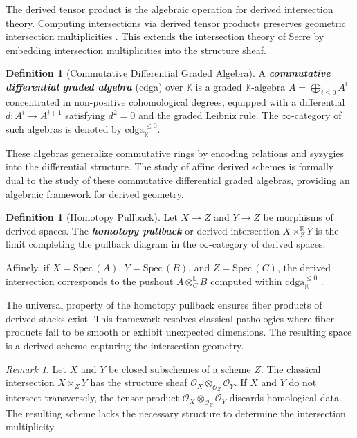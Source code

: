 \documentclass[reqno]{amsart}
\theoremstyle{definition}
\newtheorem{definition}[theorem]{Definition}
\theoremstyle{remark}
\newtheorem{remark}[theorem]{Remark}
\newcommand{\K}{\mathbb{K}}
\newcommand{\Spec}{\mathrm{Spec\,}}
\newcommand{\bfem}[1]{\textbf{\textit{#1}}}
\begin{document}
The derived tensor product is the algebraic
operation for derived intersection theory. Computing intersections
via derived tensor products preserves geometric intersection
multiplicities \cite[Section 1.1]{PTVV}. This
extends the intersection theory of Serre by
embedding intersection multiplicities into the structure sheaf.

\begin{definition}[Commutative Differential Graded Algebra]
  A \bfem{commutative differential graded algebra} (cdga) over $\K$
  is a graded $\K$-algebra $A = \bigoplus_{i \le 0} A^i$ concentrated
  in non-positive cohomological degrees, equipped with a differential
  $d: A^i \to
  A^{i+1}$ satisfying $d^2 = 0$ and the graded Leibniz rule.
  The $\infty$-category of such algebras is denoted by
  $\mathrm{cdga}_\K^{\leq 0}$.
\end{definition}
These algebras generalize commutative rings by
encoding relations and syzygies into the differential
structure. The study of affine derived schemes is formally dual to
the study of these commutative differential graded algebras,
providing an algebraic framework for derived geometry.

\begin{definition}[Homotopy Pullback]
  Let $X \to Z$ and $Y \to Z$ be morphisms of derived spaces. The
  \bfem{homotopy pullback} or derived intersection $X
  \times_Z^{\mathbb{R}} Y$ is the limit completing the
  pullback diagram in the $\infty$-category of derived spaces. 
  
  Affinely, if
  $X = \Spec(A)$, $Y = \Spec(B)$, and $Z = \Spec(C)$, the derived
  intersection corresponds to the pushout $A
  \otimes_C^{\mathbb{L}} B$ computed within
  $\mathrm{cdga}_\K^{\leq 0}$
  \cite[Section 2.2.2]{HAG-II}.
\end{definition}

The universal property of the homotopy pullback ensures fiber
products of derived stacks exist. This framework resolves classical
pathologies where fiber
products fail to be smooth or exhibit unexpected dimensions. The
resulting space is a derived scheme
capturing the intersection geometry.

\begin{remark}
  Let $X$ and $Y$ be closed subschemes of a scheme $Z$. The classical intersection $X \times_Z Y$ has the structure sheaf $\mathcal{O}_X \otimes_{\mathcal{O}_Z} \mathcal{O}_Y$. If $X$ and $Y$ do not intersect transversely, the tensor product $\mathcal{O}_X \otimes_{\mathcal{O}_Z} \mathcal{O}_Y$ discards homological data. The resulting scheme lacks the necessary structure to determine the intersection multiplicity.
\end{remark}
\end{document}
